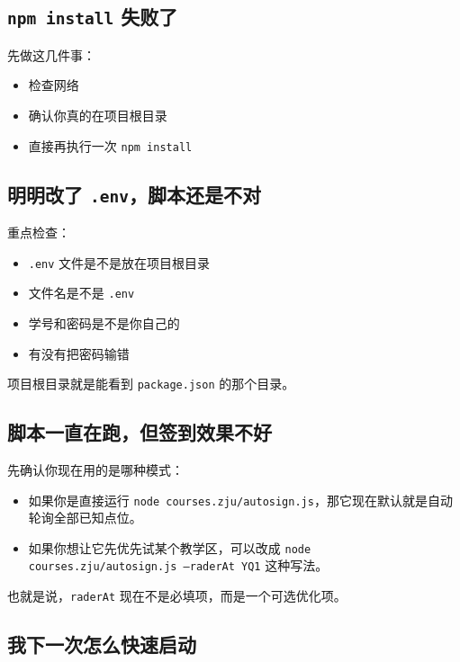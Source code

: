 \documentclass[UTF8,12pt]{ctexart}
\begin{document}
\subsection{\texttt{npm install} 失败了}

\noindent 先做这几件事：

\begin{itemize}
  \item 检查网络
  \item 确认你真的在项目根目录
  \item 直接再执行一次 \texttt{npm install}
\end{itemize}

\subsection{明明改了 \texttt{.env}，脚本还是不对}

\noindent 重点检查：

\begin{itemize}
  \item \texttt{.env} 文件是不是放在项目根目录
  \item 文件名是不是 \texttt{.env}
  \item 学号和密码是不是你自己的
  \item 有没有把密码输错
\end{itemize}

\noindent 项目根目录就是能看到 \texttt{package.json} 的那个目录。

\subsection{脚本一直在跑，但签到效果不好}

\noindent 先确认你现在用的是哪种模式：

\begin{itemize}
  \item 如果你是直接运行 \texttt{node courses.zju/autosign.js}，那它现在默认就是自动轮询全部已知点位。
  \item 如果你想让它先优先试某个教学区，可以改成 \texttt{node courses.zju/autosign.js --raderAt YQ1} 这种写法。
\end{itemize}

\noindent 也就是说，\texttt{raderAt} 现在不是必填项，而是一个可选优化项。

\subsection{我下一次怎么快速启动}
\end{document}
